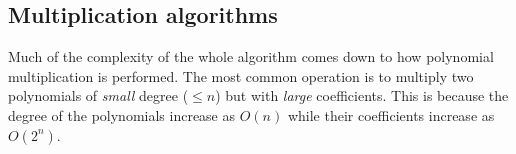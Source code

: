 \documentclass[a4paper]{article}
\begin{document}


\subsection{Multiplication algorithms}
Much of the complexity of the whole algorithm comes down to how polynomial multiplication is performed. The most common operation is to multiply two polynomials of \emph{small} degree ($\leq n$) but with \emph{large} coefficients. This is because the degree of the polynomials increase as $O(n)$ while their coefficients increase as $O(2^n)$. %


\end{document}

